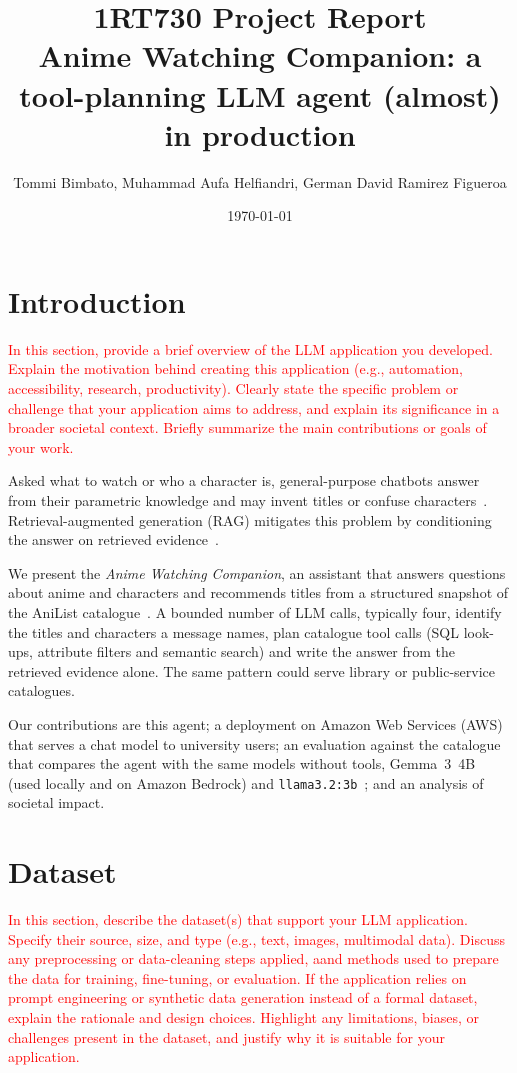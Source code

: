 \documentclass[a4paper,10pt]{article}
\title{\textbf{1RT730 Project Report}
	\\ Anime Watching Companion: a tool-planning LLM agent (almost) in production}
\author{Tommi Bimbato, Muhammad Aufa Helfiandri, German David Ramirez Figueroa}
\date{\today}
\newcommand{\instructions}[1]{\textcolor{red}{#1}}
\begin{document}
\maketitle

 \section{Introduction}
 \instructions{In this section, provide a brief overview of the LLM application you developed. Explain the motivation behind creating this application (e.g., automation, accessibility, research, productivity). Clearly state the specific problem or challenge that your application aims to address, and explain its significance in a broader societal context. Briefly summarize the main contributions or goals of your work.}

Asked what to watch or who a character is, general-purpose chatbots answer from their parametric knowledge and may invent titles or confuse characters~\cite{ji2023hallucination}. Retrieval-augmented generation (RAG) mitigates this problem by conditioning the answer on retrieved evidence~\cite{lewis2020rag}.

We present the \emph{Anime Watching Companion}, an assistant that answers questions about anime and characters and recommends titles from a structured snapshot of the AniList catalogue~\cite{anilist_kaggle}. A bounded number of LLM calls, typically four, identify the titles and characters a message names, plan catalogue tool calls (SQL look-ups, attribute filters and semantic search) and write the answer from the retrieved evidence alone. The same pattern could serve library or public-service catalogues.

Our contributions are this agent; a deployment on Amazon Web Services (AWS) that serves a chat model to university users; an evaluation against the catalogue that compares the agent with the same models without tools, Gemma~3~4B~\cite{gemma3} (used locally and on Amazon Bedrock) and \texttt{llama3.2:3b}~\cite{llama32}; and an analysis of societal impact.

	
\section{Dataset}
\instructions{In this section, describe the dataset(s) that support your LLM application. Specify their source, size, and type (e.g., text, images, multimodal data). Discuss any preprocessing or data-cleaning steps applied, aand methods used to prepare the data for training, fine-tuning, or evaluation. If the application relies on prompt engineering or synthetic data generation instead of a formal dataset, explain the rationale and design choices. Highlight any limitations, biases, or challenges present in the dataset, and justify why it is suitable for your application.}
\end{document}
